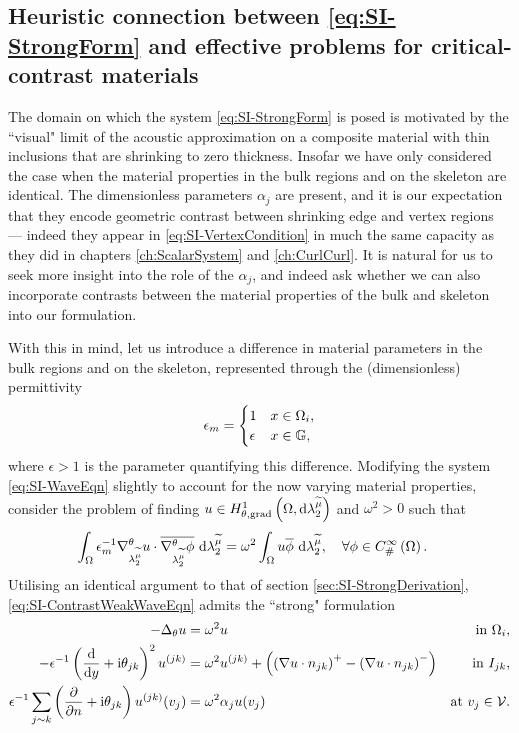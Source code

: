 \subsection{Heuristic connection between \eqref{eq:SI-StrongForm} and effective problems for critical-contrast materials} \label{ssec:SI-DoubleLimitReconcile}
The domain on which the system \eqref{eq:SI-StrongForm} is posed is motivated by the ``visual" limit of the acoustic approximation on a composite material with thin inclusions that are shrinking to zero thickness.
Insofar we have only considered the case when the material properties in the bulk regions and on the skeleton are identical.
The dimensionless parameters $\alpha_j$ are present, and it is our expectation that they encode geometric contrast between shrinking edge and vertex regions --- indeed they appear in \eqref{eq:SI-VertexCondition} in much the same capacity as they did in chapters \ref{ch:ScalarSystem} and \ref{ch:CurlCurl}.
It is natural for us to seek more insight into the role of the $\alpha_j$, and indeed ask whether we can also incorporate contrasts between the material properties of the bulk and skeleton into our formulation.

With this in mind, let us introduce a difference in material parameters in the bulk regions and on the skeleton, represented through the (dimensionless) permittivity
\begin{align*}
	\epsilon_m =
	\begin{cases} 1 & x\in\Omega_i, \\ \epsilon & x\in\mathbb{G}, \end{cases}
\end{align*}
where $\epsilon > 1$ is the parameter quantifying this difference.
Modifying the system \eqref{eq:SI-WaveEqn} slightly to account for the now varying material properties, consider the problem of finding $u\in H^1_{\theta, \mathrm{grad}}\left( \Omega, \mathrm{d}\lambda_2^{\widetilde{\mu}} \right)$ and $\omega^2>0$ such that
\begin{align} \label{eq:SI-ContrastWeakWaveEqn}
	\int_{\Omega} \epsilon_m^{-1}\nabla^{\theta}_{\lambda_2^{\widetilde{\mu}}}u\cdot\overline{\nabla^{\theta}_{\lambda_2^{\widetilde{\mu}}}\phi}  \ \mathrm{d}\lambda_2^{\widetilde{\mu}}
	&= \omega^2 \int_{\Omega} u\overline{\phi}  \ \mathrm{d}\lambda_2^{\widetilde{\mu}}, \quad\forall\phi\in C^{\infty}_{\#}\left( \Omega \right).
\end{align}
Utilising an identical argument to that of section \ref{sec:SI-StrongDerivation}, \eqref{eq:SI-ContrastWeakWaveEqn} admits the ``strong" formulation
\begin{subequations}
	\begin{align*}
		-\Delta_\theta u 
		&= \omega^2 u 
		&\text{in } \Omega_i, \\
		- \epsilon^{-1}\left( \dfrac{\mathrm{d}}{\mathrm{d}y} + \mathrm{i}\theta_{jk} \right)^2u^{(jk)}  
		&= \omega^2 u^{(jk)} + \left( \left( \nabla u\cdot n_{jk} \right)^+ - \left( \nabla u\cdot n_{jk} \right)^- \right)
		&\text{in } I_{jk}, \\
		\epsilon^{-1}\sum_{j\sim k} \left( \dfrac{\partial }{\partial n}+\mathrm{i}\theta_{jk} \right) u^{(jk)}(v_j) 
		&= \omega^2 \alpha_j u(v_j)
		&\text{at } v_j\in\mathcal{V}.
	\end{align*}
\end{subequations}

